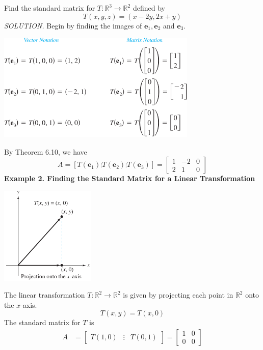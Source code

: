 \documentclass{article}
\newcommand\R{\mathbb{R}}
\begin{document}
    Find the standard matrix for $T: \R^3  \to \R^2 $ defined by
    \[T(x,y,z) = (x - 2y, 2x + y)\]
    \textit{\textcolor{blue5}{SOLUTION.}} Begin by finding the images of $ \textbf{e}_1, \textbf{e}_2$ and $ \textbf{e}_3$.
    \begin{center}
        \includegraphics[width = 9.5cm]{images/eg1standardmatrix.png}
    \end{center}
    By Theorem 6.10, we have
    \[ A = [T(\textbf{e}_1) \vdots T( \textbf{e}_2 ) \vdots T( \textbf{e}_3 )] = 
        \begin{bmatrix}
            1 & -2 & 0 \\
            2 & 1 & 0
        \end{bmatrix} \]
    \textbf{Example 2. \textcolor{blue5}{Finding the Standard Matrix for a Linear Transformation}}

    \begin{minipage}{0.3\linewidth}
        \includegraphics[width = 4.5cm]{images/xproj.png}
    \end{minipage}
    \begin{minipage}{0.65\linewidth}
    The linear transformation $T: \R^2  \to \R^2 $ is given by projecting each point in $ \R^2 $ onto the $x$-axis.
    \[T(x,y) = T(x,0)\]
    The standard matrix for $T$ is
    \begin{equation*}
        \begin{split}
            A &= \begin{bmatrix}
                T(1,0) & \vdots & T(0,1)
            \end{bmatrix} = \begin{bmatrix}
                  1 & 0\\
                  0 & 0
              \end{bmatrix}
        \end{split}
    \end{equation*}
    \end{minipage}
\end{document}
